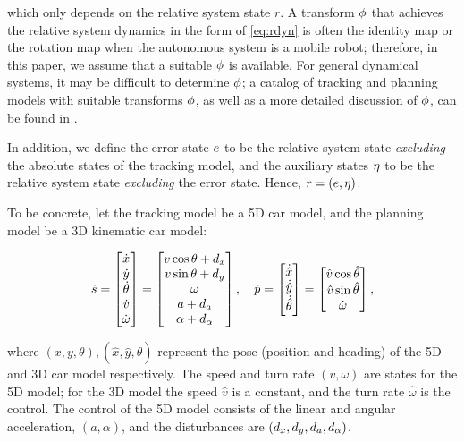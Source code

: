 \noindent which only depends on the relative system state $r$.
A transform $\phi$ that achieves the relative system dynamics in the form of \eqref{eq:rdyn} is often the identity map or the rotation map when the autonomous system is a mobile robot; therefore, in this paper, we assume that a suitable $\phi$ is available.
For general dynamical systems, it may be difficult to determine $\phi$; a catalog of tracking and planning models with suitable transforms $\phi$, as well as a more detailed discussion of $\phi$, can be found in \cite{SinghChenEtAl2018}.

In addition, we define the error state $e$ to be the relative system state \textit{excluding} the absolute states of the tracking model, and the auxiliary states $\eta$ to be the relative system state \textit{excluding} the error state.
Hence, $r = (e, \eta)$.

To be concrete, let the tracking model be a 5D car model, and the planning model be a 3D kinematic car model:

\begin{equation}
\label{eq:5D_and_3D_dyn}
\dot \tstate = 
\begin{bmatrix}
\dot x\\
\dot y\\
\dot\theta\\
\dot v\\
\dot \omega
\end{bmatrix} =
\begin{bmatrix}
v \cos \theta + \dstb_x\\
v \sin \theta + \dstb_y\\
\omega \\
a + \dstb_a\\
\alpha + \dstb_\alpha
\end{bmatrix}, \quad
\dot \pstate = 
\begin{bmatrix}
\dot {\hat x}\\
\dot {\hat y}\\
\dot {\hat \theta}
\end{bmatrix}
=
\begin{bmatrix}
\hat v \cos \hat\theta\\
\hat v \sin \hat\theta\\
\hat \omega
\end{bmatrix},
\end{equation}

\noindent where $(x,y,\theta),(\hat x, \hat y, \hat\theta)$ represent the pose (position and heading) of the 5D and 3D car model respectively.
The speed and turn rate $(v, \omega)$ are states for the 5D model; for the 3D model the speed $\hat v$ is a constant, and the turn rate $\hat \omega$ is the control.
The control of the 5D model consists of the linear and angular acceleration, $(a, \alpha)$, and the disturbances are $(d_x, d_y, d_a, d_\alpha)$.

